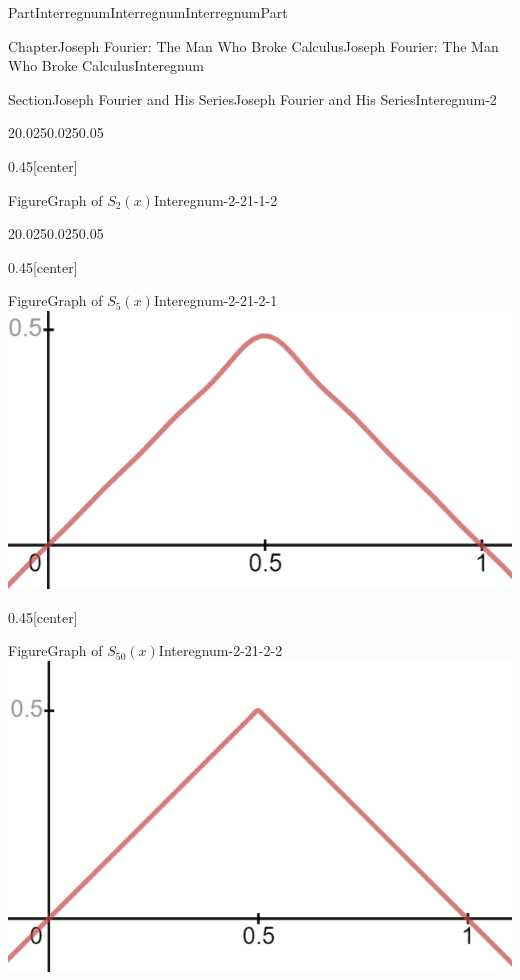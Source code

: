 \documentclass[oneside,10pt,]{book}
\numberwithin{equation}{part}
\begin{document}
\begin{partptx}{Part}{Interregnum}{}{Interregnum}{}{}{InterregnumPart}
\begin{chapterptx}{Chapter}{Joseph Fourier: The Man Who Broke Calculus}{}{Joseph Fourier: The Man Who Broke Calculus}{}{}{Interegnum}
\begin{sectionptx}{Section}{Joseph Fourier and His Series}{}{Joseph Fourier and His Series}{}{}{Interegnum-2}
\begin{sidebyside}{2}{0.025}{0.025}{0.05}
\begin{sbspanel}{0.45}[center]
\begin{panelfigureptx}{Figure}{Graph of \(S_2(x)\)}{Interegnum-2-21-1-2}{}
\tcblower
\end{panelfigureptx}%
\end{sbspanel}%
\end{sidebyside}%
\begin{sidebyside}{2}{0.025}{0.025}{0.05}%
\begin{sbspanel}{0.45}[center]%
\begin{panelfigureptx}{Figure}{Graph of \(S_5(x)\)}{Interegnum-2-21-2-1}{}%
\noindent\includegraphics[width=\linewidth]{external/images/FourierEx4-1.png}
\tcblower
\end{panelfigureptx}%
\end{sbspanel}%
\begin{sbspanel}{0.45}[center]%
\begin{panelfigureptx}{Figure}{Graph of \(S_{50}(x)\)}{Interegnum-2-21-2-2}{}%
\noindent\includegraphics[width=\linewidth]{external/images/FourierEx5-1.png}
\tcblower
\end{panelfigureptx}%
\end{sbspanel}%
\end{sidebyside}%

\end{sectionptx}
\end{chapterptx}
\end{partptx}
\end{document}
